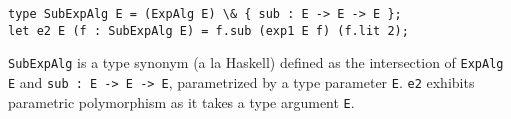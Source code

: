 \begin{lstlisting}
type SubExpAlg E = (ExpAlg E) \& { sub : E -> E -> E };
let e2 E (f : SubExpAlg E) = f.sub (exp1 E f) (f.lit 2);
\end{lstlisting}

\lstinline{SubExpAlg} is a type synonym (a la Haskell) defined as the intersection of
\lstinline{ExpAlg E} and \lstinline{sub : E -> E -> E}, parametrized by a type parameter
\lstinline{E}. \lstinline{e2} exhibits parametric polymorphism as it takes a type argument
\lstinline{E}.
